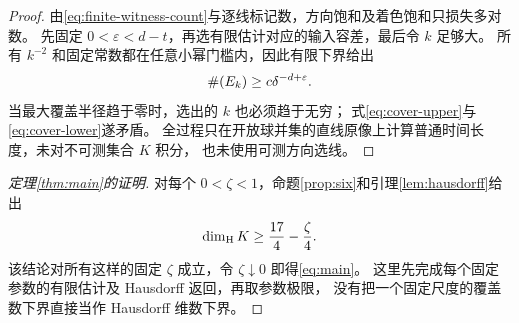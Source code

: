 \begin{proof}
由\eqref{eq:finite-witness-count}与逐线标记数，方向饱和及着色饱和只损失多对数。
先固定 $0<\varepsilon<d-t$，再选有限估计对应的输入容差，最后令 $k$ 足够大。
所有 $k^{-2}$ 和固定常数都在任意小幂门槛内，因此有限下界给出
\begin{equation}\label{eq:cover-lower}
 \#\!\left(E_k\right)\ge c\delta^{-d+\varepsilon}.
\end{equation}
当最大覆盖半径趋于零时，选出的 $k$ 也必须趋于无穷；
式\eqref{eq:cover-upper}与\eqref{eq:cover-lower}遂矛盾。
全过程只在开放球并集的直线原像上计算普通时间长度，未对不可测集合 $K$ 积分，
也未使用可测方向选线。
\end{proof}

\begin{proof}[定理\ref{thm:main}的证明]
对每个 $0<\zeta<1$，命题\ref{prop:six}和引理\ref{lem:hausdorff}给出
\[
 \operatorname{dim}_{\mathrm H} K\ge\frac{17}{4}-\frac\zeta4.
\]
该结论对所有这样的固定 $\zeta$ 成立，令 $\zeta\downarrow0$ 即得\eqref{eq:main}。
这里先完成每个固定参数的有限估计及 Hausdorff 返回，再取参数极限，
没有把一个固定尺度的覆盖数下界直接当作 Hausdorff 维数下界。
\end{proof}
